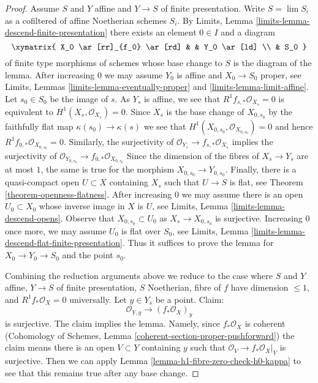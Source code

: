 \begin{proof}
\medskip\noindent
Assume $S$ and $Y$ affine and $Y \to S$ of finite presentation.
Write $S = \lim S_i$ as a cofiltered of affine Noetherian schemes $S_i$.
By Limits, Lemma \ref{limits-lemma-descend-finite-presentation}
there exists an element $0 \in I$ and a diagram
$$
\xymatrix{
X_0 \ar[rr]_{f_0} \ar[rd] & & Y_0 \ar[ld] \\
& S_0
}
$$
of finite type morphisms of schemes whose base change to $S$ is the
diagram of the lemma. After increasing $0$ we may assume $Y_0$
is affine and $X_0 \to S_0$ proper, see
Limits, Lemmas \ref{limits-lemma-eventually-proper} and
\ref{limits-lemma-limit-affine}.
Let $s_0 \in S_0$ be the image of $s$.
As $Y_s$ is affine, we see that
$R^1f_{s,*}\mathcal{O}_{X_s} = 0$ is equivalent
to $H^1(X_s, \mathcal{O}_{X_s}) = 0$.
Since $X_s$ is the base change of $X_{0, s_0}$ by
the faithfully flat map $\kappa(s_0) \to \kappa(s)$
we see that $H^1(X_{0, s_0}, \mathcal{O}_{X_{0, s_0}}) = 0$
and hence $R^1f_{0, *}\mathcal{O}_{X_{0, s_0}} = 0$.
Similarly, the surjectivity of
$\mathcal{O}_{Y_s} \to f_{s, *}\mathcal{O}_{X_s}$
implies the surjectivity of
$\mathcal{O}_{Y_{0, s_0}} \to f_{0, *}\mathcal{O}_{X_{0, s_0}}$
Since the dimension of the fibres of $X_s \to Y_s$ are at most $1$,
the same is true for the morphism $X_{0, s_0} \to Y_{0, s_0}$.
Finally, there is a quasi-compact open $U \subset X$ containing
$X_s$ such that $U \to S$ is flat, see
Theorem \ref{theorem-openness-flatness}.
After increasing $0$ we may assume there is an open
$U_0 \subset X_0$ whose inverse image in $X$ is $U$, see
Limits, Lemma \ref{limits-lemma-descend-opens}.
Observe that $X_{0, s_0} \subset U_0$ as $X_s \to X_{0, s_0}$
is surjective.
Increasing $0$ once more, we may assume $U_0$ is flat over $S_0$, see
Limits, Lemma \ref{limits-lemma-descend-flat-finite-presentation}.
Thus it suffices to prove the lemma for
$X_0 \to Y_0 \to S_0$ and the point $s_0$.

\medskip\noindent
Combining the reduction arguments above we reduce to the case where
$S$ and $Y$ affine, $Y \to S$ of finite presentation, $S$ Noetherian,
fibre of $f$ have dimension $\leq 1$, and $R^1f_*\mathcal{O}_X = 0$
universally. Let $y \in Y_s$ be a point. Claim:
$$
\mathcal{O}_{Y, y} \longrightarrow (f_*\mathcal{O}_X)_y
$$
is surjective. The claim implies the lemma. Namely, since
$f_*\mathcal{O}_X$ is coherent (Cohomology of Schemes, Lemma
\ref{coherent-section-proper-pushforward})
the claim means there is an open $V \subset Y$ containing $y$
such that $\mathcal{O}_V \to f_*\mathcal{O}_X|_V$ is surjective.
Then we can apply Lemma \ref{lemma-h1-fibre-zero-check-h0-kappa}
to see that this remains true after any base change.


\end{proof}
